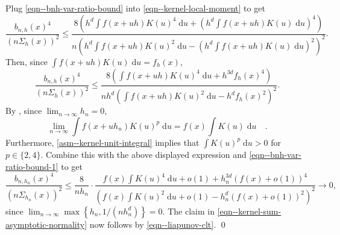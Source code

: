Plug \eqref{eqn--bnh-var-ratio-bound} into \eqref{eqn--kernel-local-moment} to
get
\begin{equation*}
  \frac{b_{n, h} (x)^{4}}{\left( n \Sigma_{h} (x) \right)^{2}} \leq \frac{8
  \left( h^{d} \int f (x + u h) K (u)^{4} \; \mathrm{d} u + \left( h^{d} \int f
  (x + u h) K (u) \; \mathrm{d} u \right)^{4} \right)}{n \left( h^{d} \int f (x
  + u h) K (u)^{2} \; \mathrm{d} u - \left( h^{d} \int f (x + u h) K (u) \;
  \mathrm{d} u \right)^{2} \right)^{2}}.
\end{equation*}
Then, since \(\int f (x + u h) K (u) \; \mathrm{d} u = f_{h} (x)\),
\begin{equation}
  \frac{b_{n, h} (x)^{4}}{\left( n \Sigma_{h} (x) \right)^{2}} \leq \frac{8
  \left( \int f (x + u h) K (u)^{4} \; \mathrm{d} u + h^{3 d} f_{h} (x)^{4}
  \right)}{n h^{d} \left( \int f (x + u h) K (u)^{2} \; \mathrm{d} u - h^{d}
  f_{h} (x)^{2} \right)^{2}}.
  \label{eqn--bnh-var-ratio-bound-1}
\end{equation}
By , since \(\lim_{n \to \infty} h_{n} =
0\),
\begin{equation*}
  \lim_{n \to \infty} \int f \left( x + u h_{n} \right) K (u)^{p} \; \mathrm{d}
  u = f (x) \int K (u) \; \mathrm{d} u \quad.
\end{equation*}
Furthermore,  \ref{asm--kernel-unit-integral} implies that
\(\int K (u)^{p} \; \mathrm{d} u > 0\) for \(p \in \{2, 4\}\).
Combine this with the above displayed expression and
\eqref{eqn--bnh-var-ratio-bound-1} to get
\begin{equation*}
  \frac{b_{n, h_{n}} (x)^{4}}{\left( n \Sigma_{h_{n}} (x) \right)^{2}} \leq
  \frac{8}{n h_{n}} \cdot \frac{f (x) \int K (u)^{4} \; \mathrm{d} u + o (1) +
  h_{n}^{3 d} (f (x) + o (1))^{4}}{\left( f (x) \int K (u)^{2} \; \mathrm{d} u +
  o (1) - h_{n}^{d} (f (x) + o (1))^{2} \right)^{2}} \to 0,
\end{equation*}
since \(\lim_{n \to \infty} \max\left\{ h_{n}, 1 / \left( n h_{n}^{d} \right)
\right\} = 0\).
The claim in \eqref{eqn--kernel-sum-asymptotic-normality} now follows by
\eqref{eqn--liapunov-clt}.
\qed

